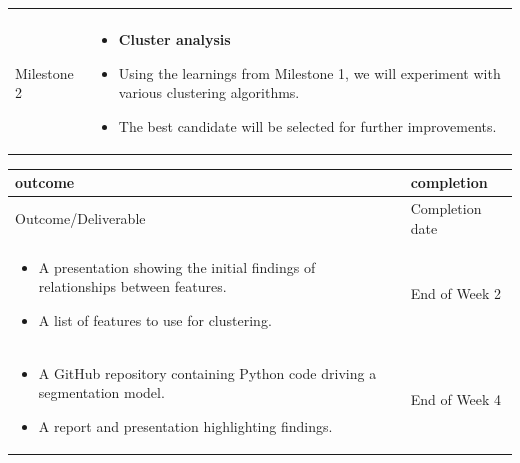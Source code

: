 \documentclass[
]{book}
\providecommand{\tightlist}{%
  \setlength{\itemsep}{0pt}\setlength{\parskip}{0pt}}
\begin{document}
\begin{longtable}[]{@{}ll@{}}
\begin{minipage}[t]{0.43\columnwidth}
\end{minipage}\tabularnewline
\begin{minipage}[t]{0.18\columnwidth}\raggedright
Milestone 2\strut
\end{minipage} & \begin{minipage}[t]{0.43\columnwidth}\raggedright
\begin{itemize}
\tightlist
\item
  \textbf{Cluster analysis}
\item
  Using the learnings from
  Milestone 1, we will
  experiment with various
  clustering algorithms.
\item
  The best candidate will be
  selected for further
  improvements.
\end{itemize}\strut
\end{minipage}\tabularnewline
\bottomrule
\end{longtable}

\begin{longtable}[]{@{}ll@{}}
\toprule
\begin{minipage}[b]{0.43\columnwidth}\raggedright
outcome\strut
\end{minipage} & \begin{minipage}[b]{0.24\columnwidth}\raggedright
completion\strut
\end{minipage}\tabularnewline
\midrule
\endhead
\begin{minipage}[t]{0.43\columnwidth}\raggedright
Outcome/Deliverable\strut
\end{minipage} & \begin{minipage}[t]{0.24\columnwidth}\raggedright
Completion date\strut
\end{minipage}\tabularnewline
\begin{minipage}[t]{0.43\columnwidth}\raggedright
\begin{itemize}
\tightlist
\item
  A presentation showing the
  initial findings of
  relationships between
  features.
\item
  A list of features to use
  for clustering.
\end{itemize}\strut
\end{minipage} & \begin{minipage}[t]{0.24\columnwidth}\raggedright
End of Week 2\strut
\end{minipage}\tabularnewline
\begin{minipage}[t]{0.43\columnwidth}\raggedright
\begin{itemize}
\tightlist
\item
  A GitHub repository
  containing Python code driving
  a segmentation model.
\item
  A report and presentation
  highlighting findings.
\end{itemize}\strut
\end{minipage} & \begin{minipage}[t]{0.24\columnwidth}\raggedright
End of Week 4\strut
\end{minipage}\tabularnewline
\bottomrule
\end{longtable}
\end{document}
